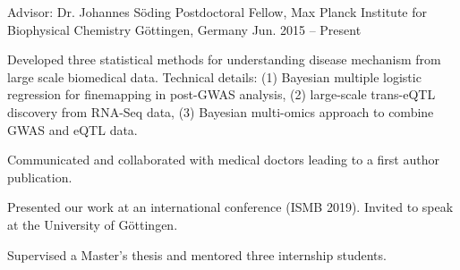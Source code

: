 


\begin{cventries}


\cventry
{Advisor: Dr. Johannes S{\"o}ding} %
{Postdoctoral Fellow, Max Planck Institute for Biophysical Chemistry} %
{G{\"o}ttingen, Germany} %
{Jun. 2015 -- Present} %
{ %
\begin{cvitems}
\item {Developed three statistical methods for understanding disease mechanism from large scale biomedical data.
       Technical details: (1) Bayesian multiple logistic regression for finemapping in post-GWAS analysis, (2) large-scale trans-eQTL discovery from RNA-Seq data, (3) Bayesian multi-omics approach to combine GWAS and eQTL data.}
\item {Communicated and collaborated with medical doctors leading to a first author publication.}
\item {Presented our work at an international conference (ISMB 2019). Invited to speak at the University of G{\"o}ttingen.}
\item {Supervised a Master's thesis and mentored three internship students.}
\end{cvitems}
}



\end{cventries}
